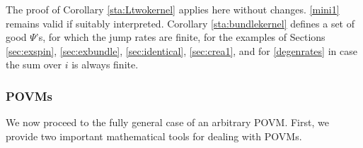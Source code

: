 \documentclass[12pt]{article}
\newcommand{\1}{\mathbf{1}} %
\begin{document}
The proof of Corollary \ref{sta:Ltwokernel} applies here without
changes.   \eqref{mini1} remains  valid if suitably interpreted.
Corollary \ref{sta:bundlekernel} defines a set  of good $\Psi$'s, for
which the jump rates are finite, for the examples of Sections
\ref{sec:exspin}, \ref{sec:exbundle}, \ref{sec:identical},
\ref{sec:crea1}, and for \eqref{degenrates} in case the sum
over $i$ is always finite.



\subsubsection{POVMs}
\label{sec:povmkernel}

We now proceed to the fully general case of an arbitrary POVM.  First,
we provide two important mathematical tools for dealing with POVMs.
\end{document}
